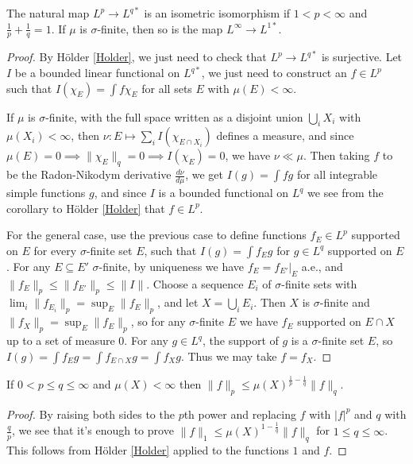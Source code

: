 \begin{thm} The natural map $L^p \rightarrow L^{q*}$ is an isometric isomorphism if $1 < p < \infty$ and $\frac{1}{p} + \frac{1}{q} = 1$. If $\mu$ is $\sigma$-finite, then so is the map $L^\infty \rightarrow L^{1*}$.
\end{thm}
\begin{proof} By H\"older \ref{Holder}, we just need to check that $L^p \rightarrow L^{q*}$ is surjective. Let $I$ be a bounded linear functional on $L^{q*}$, we just need to construct an $f \in L^p$ such that $I(\chi_E) = \int f\chi_E$ for all sets $E$ with $\mu(E) < \infty$.

If $\mu$ is $\sigma$-finite, with the full space written as a disjoint union $\bigcup_i X_i$ with $\mu(X_i) < \infty$, then $\nu : E \mapsto \sum_i I(\chi_{E\cap X_i})$ defines a measure, and since $\mu(E) = 0 \implies \|\chi_E\|_q = 0 \implies I(\chi_E) = 0$, we have $\nu \ll \mu$. Then taking $f$ to be the Radon-Nikodym derivative $\frac{d\nu}{d\mu}$, we get $I(g) = \int fg$ for all integrable simple functions $g$, and since $I$ is a bounded functional on $L^q$ we see from the corollary to H\"older \ref{Holder} that $f \in L^p$.

For the general case, use the previous case to define functions $f_E \in L^p$ supported on $E$ for every $\sigma$-finite set $E$, such that $I(g) = \int f_Eg$ for $g \in L^q$ supported on $E$. For any $E \subseteq E'$ $\sigma$-finite, by uniqueness we have $f_E = f_{E'}|_E$ a.e., and $\|f_E\|_p \le \|f_{E'}\|_p \le \|I\|$. Choose a sequence $E_i$ of $\sigma$-finite sets with $\lim_i \|f_{E_i}\|_p = \sup_E \|f_E\|_p$, and let $X = \bigcup_i E_i$. Then $X$ is $\sigma$-finite and $\|f_X\|_p = \sup_E \|f_E\|_p$, so for any $\sigma$-finite $E$ we have $f_E$ supported on $E \cap X$ up to a set of measure $0$. For any $g \in L^q$, the support of $g$ is a $\sigma$-finite set $E$, so $I(g) = \int f_Eg = \int f_{E\cap X}g = \int f_Xg$. Thus we may take $f = f_X$.
\end{proof}

\begin{prop} If $0 < p \le q \le \infty$ and $\mu(X) < \infty$ then $\|f\|_p \le \mu(X)^{\frac{1}{p} - \frac{1}{q}}\|f\|_q$.
\end{prop}
\begin{proof} By raising both sides to the $p$th power and replacing $f$ with $|f|^p$ and $q$ with $\frac{q}{p}$, we see that it's enough to prove $\|f\|_1 \le \mu(X)^{1-\frac{1}{q}}\|f\|_q$ for $1 \le q \le \infty$. This follows from H\"older \ref{Holder} applied to the functions $1$ and $f$.
\end{proof}

